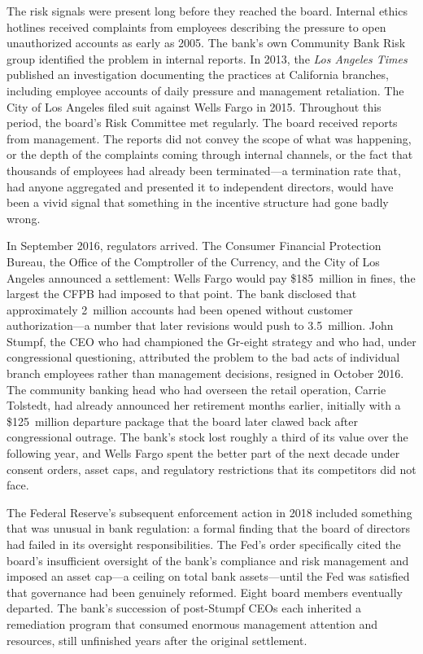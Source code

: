 \documentclass[11pt,openany]{book}
\begin{document}
\begin{corporateexample}
The risk signals were present long before they reached the board. Internal
ethics hotlines received complaints from employees describing the pressure to
open unauthorized accounts as early as 2005. The bank's own Community Bank
Risk group identified the problem in internal reports. In 2013, the
\emph{Los Angeles Times} published an investigation documenting the practices
at California branches, including employee accounts of daily pressure and
management retaliation. The City of Los Angeles filed suit against Wells
Fargo in 2015. Throughout this period, the board's Risk Committee met
regularly. The board received reports from management. The reports did not
convey the scope of what was happening, or the depth of the complaints coming
through internal channels, or the fact that thousands of employees had
already been terminated---a termination rate that, had anyone aggregated and
presented it to independent directors, would have been a vivid signal that
something in the incentive structure had gone badly wrong.

In September 2016, regulators arrived. The Consumer Financial Protection
Bureau, the Office of the Comptroller of the Currency, and the City of Los
Angeles announced a settlement: Wells Fargo would pay \$185~million in fines,
the largest the CFPB had imposed to that point. The bank disclosed that
approximately 2~million accounts had been opened without customer
authorization---a number that later revisions would push to 3.5~million. John
Stumpf, the CEO who had championed the Gr-eight strategy and who had, under
congressional questioning, attributed the problem to the bad acts of
individual branch employees rather than management decisions, resigned in
October 2016. The community banking head who had overseen the retail
operation, Carrie Tolstedt, had already announced her retirement months
earlier, initially with a \$125~million departure package that the board
later clawed back after congressional outrage. The bank's stock lost roughly
a third of its value over the following year, and Wells Fargo spent the
better part of the next decade under consent orders, asset caps, and
regulatory restrictions that its competitors did not face.

The Federal Reserve's subsequent enforcement action in 2018 included
something that was unusual in bank regulation: a formal finding that the
board of directors had failed in its oversight responsibilities. The Fed's
order specifically cited the board's insufficient oversight of the bank's
compliance and risk management and imposed an asset cap---a ceiling on total
bank assets---until the Fed was satisfied that governance had been genuinely
reformed. Eight board members eventually departed. The bank's succession of
post-Stumpf CEOs each inherited a remediation program that consumed enormous
management attention and resources, still unfinished years after the original
settlement.


\end{corporateexample}
\end{document}
